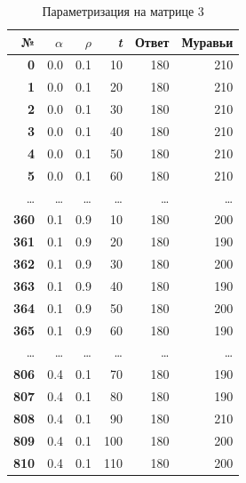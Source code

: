\documentclass[a4paper,12pt]{article}
\begin{document}
\begin{table} [h!]
\begin{center}
\caption{Параметризация на матрице 3}
\begin{tabular}{|r|r|r|r|r|r|}
\hline
   {\bf №} & {\bf $\alpha$} &  {\bf $\rho$} &    {\bf \textit{t}} & {\bf Ответ} & {\bf Муравьи} \\
\hline
   {\bf 0} &        0.0 &        0.1 &       10 &        180 &        210 \\
\hline
   {\bf 1} &        0.0 &        0.1 &       20 &        180 &        210 \\
\hline
   {\bf 2} &        0.0 &        0.1 &       30 &        180 &        210 \\
\hline
   {\bf 3} &        0.0 &        0.1 &       40 &        180 &        210 \\
\hline
   {\bf 4} &        0.0 &        0.1 &       50 &        180 &        210 \\
\hline
   {\bf 5} &        0.0 &        0.1 &       60 &        180 &        210 \\
\hline
\ldots & \ldots & \ldots & \ldots & \ldots & \ldots\\
\hline
 {\bf 360} &        0.1 &        0.9 &       10 &        180 &        200 \\
\hline
 {\bf 361} &        0.1 &        0.9 &       20 &        180 &        190 \\
\hline
 {\bf 362} &        0.1 &        0.9 &       30 &        180 &        200 \\
\hline
 {\bf 363} &        0.1 &        0.9 &       40 &        180 &        190 \\
\hline
 {\bf 364} &        0.1 &        0.9 &       50 &        180 &        200 \\
\hline
 {\bf 365} &        0.1 &        0.9 &       60 &        180 &        190 \\
\hline
\ldots & \ldots & \ldots & \ldots & \ldots & \ldots\\
\hline
 {\bf 806} &        0.4 &        0.1 &       70 &        180 &        190 \\
\hline
 {\bf 807} &        0.4 &        0.1 &       80 &        180 &        190 \\
\hline
 {\bf 808} &        0.4 &        0.1 &       90 &        180 &        210 \\
\hline
 {\bf 809} &        0.4 &        0.1 &      100 &        180 &        200 \\
\hline
 {\bf 810} &        0.4 &        0.1 &      110 &        180 &        200 \\

\end{tabular}
\end{center}
\end{table}
\end{document}
